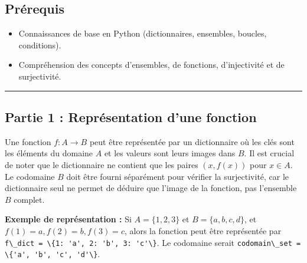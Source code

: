 \documentclass[12pt,a4paper]{report}
\newcommand{\passthrough}[1]{#1}
\providecommand{\tightlist}{%
  \setlength{\itemsep}{0pt}\setlength{\parskip}{0pt}}
\begin{document}
\subsection{Prérequis}\label{pruxe9requis}

\begin{itemize}
\tightlist
\item
  Connaissances de base en Python (dictionnaires, ensembles, boucles,
  conditions).
\item
  Compréhension des concepts d'ensembles, de fonctions, d'injectivité et
  de surjectivité.
\end{itemize}

\begin{center}\rule{0.5\linewidth}{0.5pt}\end{center}

\subsection{Partie 1 : Représentation d'une
fonction}\label{partie-1-repruxe9sentation-dune-fonction}

Une fonction \(f: A \to B\) peut être représentée par un dictionnaire où
les clés sont les éléments du domaine \(A\) et les valeurs sont leurs
images dans \(B\). Il est crucial de noter que le dictionnaire ne
contient que les paires \((x, f(x))\) pour \(x \in A\). Le codomaine
\(B\) doit être fourni séparément pour vérifier la surjectivité, car le
dictionnaire seul ne permet de déduire que l'image de la fonction, pas
l'ensemble \(B\) complet.

\textbf{Exemple de représentation :} Si \(A = \{1, 2, 3\}\) et
\(B = \{a, b, c, d\}\), et \(f(1)=a, f(2)=b, f(3)=c\), alors la fonction
peut être représentée par
\passthrough{\lstinline!f\_dict = \{1: 'a', 2: 'b', 3: 'c'\}!}. Le
codomaine serait
\passthrough{\lstinline!codomain\_set = \{'a', 'b', 'c', 'd'\}!}.
\end{document}

